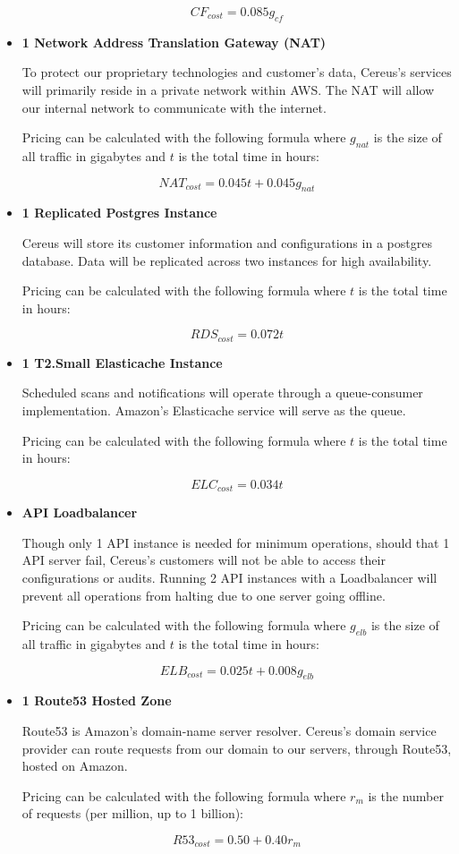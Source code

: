 \begin{itemize}
\[ CF_{cost} = 0.085g_{cf} \]

\item \textbf{1 Network Address Translation Gateway (NAT)}

To protect our proprietary technologies and customer's data, Cereus's services will primarily reside in a private network within AWS. The NAT will allow our internal network to communicate with the internet. 

Pricing can be calculated with the following formula where \( g_{nat} \) is the size of all traffic in gigabytes and \( t \) is the total time in hours:

\[ NAT_{cost} = 0.045t + 0.045g_{nat} \]

\item \textbf{1 Replicated Postgres Instance}

Cereus will store its customer information and configurations in a postgres database. Data will be replicated across two instances for high availability.

Pricing can be calculated with the following formula where \( t \) is the total time in hours:

\[ RDS_{cost} = 0.072t \]

\item \textbf{1 T2.Small Elasticache Instance}

Scheduled scans and notifications will operate through a queue-consumer implementation. Amazon's Elasticache service will serve as the queue.

Pricing can be calculated with the following formula where \( t \) is the total time in hours:

\[ ELC_{cost} = 0.034t \]

\item \textbf{API Loadbalancer}

Though only 1 API instance is needed for minimum operations, should that 1 API server fail, Cereus's customers will not be able to access their configurations or audits. Running 2 API instances with a Loadbalancer will prevent all operations from halting due to one server going offline.

Pricing can be calculated with the following formula where \( g_{elb} \) is the size of all traffic in gigabytes and \( t \) is the total time in hours:

\[ ELB_{cost} = 0.025t + 0.008g_{elb} \]

\item \textbf{1 Route53 Hosted Zone}

Route53 is Amazon's domain-name server resolver. Cereus's domain service provider can route requests from our domain to our servers, through Route53, hosted on Amazon.

Pricing can be calculated with the following formula where \( r_{m} \) is the number of requests (per million, up to 1 billion):

\[ R53_{cost} = 0.50 + 0.40r_{m} \]

\end{itemize}

